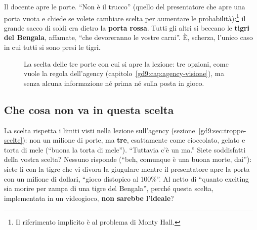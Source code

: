 Il docente apre le porte. ``Non è il trucco'' (quello del presentatore che
apre una porta vuota e chiede se volete cambiare scelta per aumentare le
probabilità):\footnote{Il riferimento implicito è al problema di Monty Hall.}
il grande sacco di soldi era dietro la \textbf{porta rossa}. Tutti gli altri
si beccano le \textbf{tigri del Bengala}, affamate, ``che devoreranno le
vostre carni''. È, scherza, l'unico caso in cui tutti si sono presi le tigri.

\begin{figure}[htbp]
  \centering
  \caption{La scelta delle tre porte con cui si apre la lezione: tre opzioni,
  come vuole la regola dell'agency (capitolo~\ref{gd9:cap:agency-visione}),
  ma senza alcuna informazione né prima né sulla posta in gioco.}
  \label{gd15:fig:porte}
\end{figure}

\subsection{Che cosa non va in questa scelta}

La scelta rispetta i limiti visti nella lezione sull'agency
(sezione~\ref{gd9:sec:troppe-scelte}): non un milione di porte, ma
\textbf{tre}, esattamente come cioccolato, gelato e torta di mele (``buona
la torta di mele''). ``Tuttavia c'è un ma.'' Siete soddisfatti della vostra
scelta? Nessuno risponde (``beh, comunque è una buona morte, dai''): siete lì
con la tigre che vi divora la giugulare mentre il presentatore apre la porta
con un milione di dollari, ``gioco distopico al 100\%''. Al netto di
``quanto exciting sia morire per zampa di una tigre del Bengala'', perché
questa scelta, implementata in un videogioco, \textbf{non sarebbe l'ideale}?

